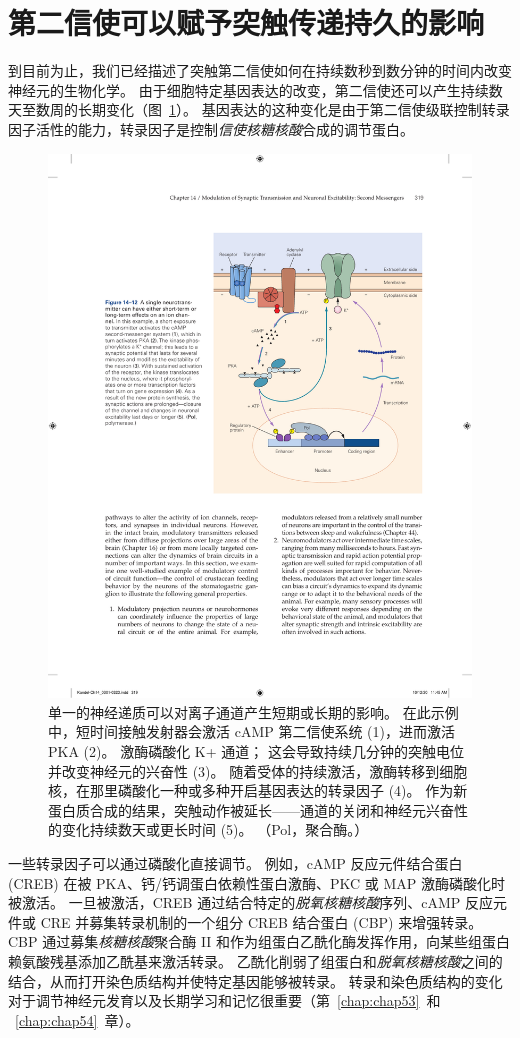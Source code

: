\section{第二信使可以赋予突触传递持久的影响}

到目前为止，我们已经描述了突触第二信使如何在持续数秒到数分钟的时间内改变神经元的生物化学。
由于细胞特定基因表达的改变，第二信使还可以产生持续数天至数周的长期变化（图~\ref{fig:14_12}）。 
基因表达的这种变化是由于第二信使级联控制转录因子活性的能力，转录因子是控制\textit{信使核糖核酸}合成的调节蛋白。


\begin{figure}[htbp]
	\centering
	\includegraphics[width=0.7\linewidth]{chap14/fig_14_12}
	\caption{单一的神经递质可以对离子通道产生短期或长期的影响。 在此示例中，短时间接触发射器会激活 cAMP 第二信使系统 (1)，进而激活 PKA (2)。 激酶磷酸化 K+ 通道； 这会导致持续几分钟的突触电位并改变神经元的兴奋性 (3)。 随着受体的持续激活，激酶转移到细胞核，在那里磷酸化一种或多种开启基因表达的转录因子 (4)。 作为新蛋白质合成的结果，突触动作被延长——通道的关闭和神经元兴奋性的变化持续数天或更长时间 (5)。 （Pol，聚合酶。）}
	\label{fig:14_12}
\end{figure}


一些转录因子可以通过磷酸化直接调节。
例如，cAMP 反应元件结合蛋白 (CREB) 在被 PKA、钙/钙调蛋白依赖性蛋白激酶、PKC 或 MAP 激酶磷酸化时被激活。
一旦被激活，CREB 通过结合特定的\textit{脱氧核糖核酸}序列、cAMP 反应元件或 CRE 并募集转录机制的一个组分 CREB 结合蛋白 (CBP) 来增强转录。
CBP 通过募集\textit{核糖核酸}聚合酶 II 和作为组蛋白乙酰化酶发挥作用，向某些组蛋白赖氨酸残基添加乙酰基来激活转录。
乙酰化削弱了组蛋白和\textit{脱氧核糖核酸}之间的结合，从而打开染色质结构并使特定基因能够被转录。
转录和染色质结构的变化对于调节神经元发育以及长期学习和记忆很重要（第~\ref{chap:chap53}~和 ~\ref{chap:chap54}~章）。



